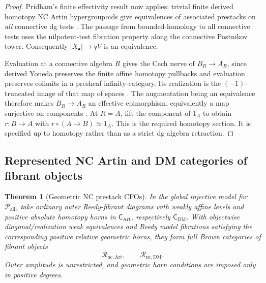 \documentclass[12pt]{amsart}
\newtheorem{thm}{Theorem}[section]
\theoremstyle{definition}
\theoremstyle{remark}
\numberwithin{equation}{section}
\newcommand{\y}{\mathsf y}
\begin{document}
\begin{proof}
Pridham's finite effectivity result now applies:
trivial finite derived homotopy NC Artin hypergroupoids give
equivalences of associated prestacks on \emph{all} connective dg
tests \cite[Remarks~2.34, pp.~24--25]{PridhamNC2023}.
The passage from bounded-homology to all connective tests uses
the nilpotent-test fibration property along the connective
Postnikov tower. Consequently $|X_\bullet|\to\y V$ is an equivalence.

Evaluation at a connective algebra $R$ gives the Cech nerve of
$B_R\to A_R$, since derived Yoneda preserves the finite affine
homotopy pullbacks and evaluation preserves colimits in a presheaf
infinity-category. Its realization is the $(-1)$-truncated image of
that map of spaces \cite[Proposition~6.2.3.4]{LurieHTT2009}. The
augmentation being an equivalence therefore makes $B_R\to A_R$ an
effective epimorphism, equivalently a map surjective on components
\cite[Corollary~7.2.1.15]{LurieHTT2009}. At $R=A$, lift the
component of $1_A$ to obtain $r:B\to A$ with
$r\circ(A\to B)\simeq1_A$. This is the required homotopy section.
It is specified up to homotopy rather than as a strict dg
algebra retraction.
\end{proof}

\subsection{Represented NC Artin and DM categories of fibrant objects}

\begin{thm}[Geometric NC prestack CFOs]
\label{thm:nc-geometric-cfo}
In the global injective model for $\mathcal P_{\mathrm{all}}$, take
ordinary outer Reedy-fibrant diagrams with weakly affine levels and
positive absolute homotopy horns in $\mathsf C_{\mathrm{Art}}$,
respectively $\mathsf C_{\mathrm{DM}}$. With objectwise
diagonal/realization weak equivalences and Reedy model fibrations
satisfying the corresponding positive relative geometric horns,
they form full Brown categories of fibrant objects
\[
 \mathscr R_{\mathrm{nc,Art}},\qquad
 \mathscr R_{\mathrm{nc,DM}}.
\]
Outer amplitude is unrestricted, and geometric horn
conditions are imposed only in positive degrees.
\end{thm}
\end{document}
